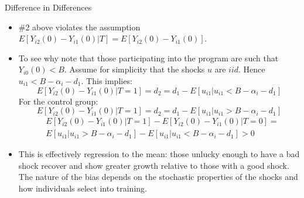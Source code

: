 \documentclass[xcolor=pdftex,dvipsnames,table,mathserif,aspectratio=169]{beamer}
\begin{document}
\begin{frame}{Difference in Differences}
\small
\begin{itemize}
\item  \#2 above violates the assumption {\small $E[Y_{i2}(0) - Y_{i1}(0) | T] = E[Y_{i2}(0) - Y_{i1}(0)]$}. 
\item To see why note that those participating into the program are such
that {\small $Y_{i0}(0) < B$}. Assume for simplicity that the shocks {\small $u$} are {\small $iid$}. Hence {\small $u_{i1} < B- \alpha_i - d_1$}. 
This implies: 
{\small $$E[Y_{i2}(0)- Y_{i1}(0) | T=1] = d_2 = d_1 - E[u_{i1}| u_{i1} <  B-\alpha_i - d_1]$$}
For the control group:
{\small $$E[Y_{i2}(0) - Y_{i1}(0) | T=1] = d_2 = d_1 - E[u_{i1}| u_{i1} >  B-\alpha_i - d_1]$$}
\vspace{-1cm}
\begin{align*}
& E[Y_{i2}(0) - Y_{i1}(0) | T=1] - E[Y_{i2}(0) - Y_{i1}(0) | T=0] =\\
&  E[u_{i1} | u_{i1} >  B-\alpha_i - d_1] - E[u_{i1} | u_{i1} < B-\alpha_i - d_1]  >0
  \end{align*}
 \item This is effectively regression to the mean: those unlucky enough to have a bad shock recover and show greater growth relative to those with a good shock. The nature of the bias depends on the stochastic properties of the shocks and how individuals select into training.
\end{itemize}
\end{frame} 

%
\end{document}
